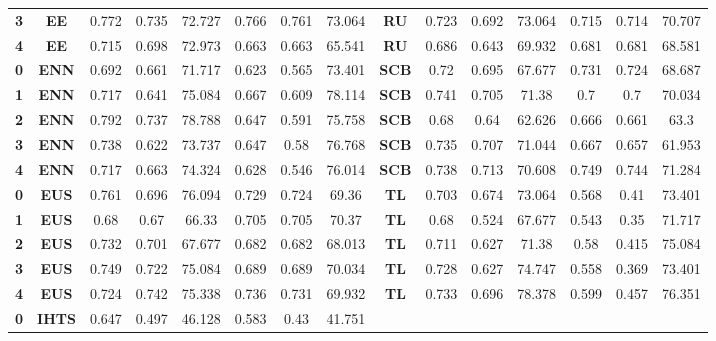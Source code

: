 {{\begin{tabular}{c|c|cccccc|ccccccc}
\textbf{3} & \textbf{EE} & 0.772 & 0.735 & 72.727 & 0.766 & 0.761 & 73.064 & \multicolumn{1}{c|}{\textbf{RU}} & 0.723 & 0.692 & 73.064 & 0.715 & 0.714 & 70.707 \\
\textbf{4} & \textbf{EE} & 0.715 & 0.698 & 72.973 & 0.663 & 0.663 & 65.541 & \multicolumn{1}{c|}{\textbf{RU}} & 0.686 & 0.643 & 69.932 & 0.681 & 0.681 & 68.581 \\
\textbf{0} & \textbf{ENN} & 0.692 & 0.661 & 71.717 & 0.623 & 0.565 & 73.401 & \multicolumn{1}{c|}{\textbf{SCB}} & 0.72  & 0.695 & 67.677 & 0.731 & 0.724 & 68.687 \\
\textbf{1} & \textbf{ENN} & 0.717 & 0.641 & 75.084 & 0.667 & 0.609 & 78.114 & \multicolumn{1}{c|}{\textbf{SCB}} & 0.741 & 0.705 & 71.38 & 0.7   & 0.7   & 70.034 \\
\textbf{2} & \textbf{ENN} & 0.792 & 0.737 & 78.788 & 0.647 & 0.591 & 75.758 & \multicolumn{1}{c|}{\textbf{SCB}} & 0.68  & 0.64  & 62.626 & 0.666 & 0.661 & 63.3 \\
\textbf{3} & \textbf{ENN} & 0.738 & 0.622 & 73.737 & 0.647 & 0.58  & 76.768 & \multicolumn{1}{c|}{\textbf{SCB}} & 0.735 & 0.707 & 71.044 & 0.667 & 0.657 & 61.953 \\
\textbf{4} & \textbf{ENN} & 0.717 & 0.663 & 74.324 & 0.628 & 0.546 & 76.014 & \multicolumn{1}{c|}{\textbf{SCB}} & 0.738 & 0.713 & 70.608 & 0.749 & 0.744 & 71.284 \\
\textbf{0} & \textbf{EUS} & 0.761 & 0.696 & 76.094 & 0.729 & 0.724 & 69.36 & \multicolumn{1}{c|}{\textbf{TL}} & 0.703 & 0.674 & 73.064 & 0.568 & 0.41  & 73.401 \\
\textbf{1} & \textbf{EUS} & 0.68  & 0.67  & 66.33 & 0.705 & 0.705 & 70.37 & \multicolumn{1}{c|}{\textbf{TL}} & 0.68  & 0.524 & 67.677 & 0.543 & 0.35  & 71.717 \\
\textbf{2} & \textbf{EUS} & 0.732 & 0.701 & 67.677 & 0.682 & 0.682 & 68.013 & \multicolumn{1}{c|}{\textbf{TL}} & 0.711 & 0.627 & 71.38 & 0.58  & 0.415 & 75.084 \\
\textbf{3} & \textbf{EUS} & 0.749 & 0.722 & 75.084 & 0.689 & 0.689 & 70.034 & \multicolumn{1}{c|}{\textbf{TL}} & 0.728 & 0.627 & 74.747 & 0.558 & 0.369 & 73.401 \\
\textbf{4} & \textbf{EUS} & 0.724 & 0.742 & 75.338 & 0.736 & 0.731 & 69.932 & \multicolumn{1}{c|}{\textbf{TL}} & 0.733 & 0.696 & 78.378 & 0.599 & 0.457 & 76.351 \\
\textbf{0} & \textbf{IHTS} & 0.647 & 0.497 & 46.128 & 0.583 & 0.43  & 41.751 &       &       &       &       &       &       &  \\

\end{tabular}}}
